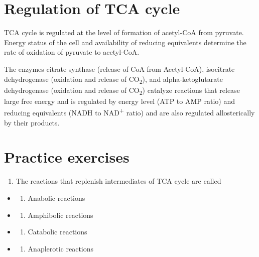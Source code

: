 \documentclass[
]{book}
\providecommand{\tightlist}{%
  \setlength{\itemsep}{0pt}\setlength{\parskip}{0pt}}
\begin{document}
\section{Regulation of TCA cycle}\label{regulation-of-tca-cycle}

TCA cycle is regulated at the level of formation of acetyl-CoA from pyruvate. Energy status of the cell and availability of reducing equivalents determine the rate of oxidation of pyruvate to acetyl-CoA.

The enzymes citrate synthase (release of CoA from Acetyl-CoA), isocitrate dehydrogenase (oxidation and release of CO\textsubscript{2}), and alpha-ketoglutarate dehydrogenase (oxidation and release of CO\textsubscript{2}) catalyze reactions that release large free energy and is regulated by energy level (ATP to AMP ratio) and reducing equivalents (NADH to NAD\textsuperscript{+} ratio) and are also regulated allosterically by their products.

\section{Practice exercises}\label{practice-exercises-2}

\begin{enumerate}
\def\labelenumi{\arabic{enumi}.}
\tightlist
\item
  The reactions that replenish intermediates of TCA cycle are called
\end{enumerate}

\begin{itemize}
\tightlist
\item
  \begin{enumerate}
  \def\labelenumi{(\Alph{enumi})}
  \tightlist
  \item
    Anabolic reactions\\
  \end{enumerate}
\item
  \begin{enumerate}
  \def\labelenumi{(\Alph{enumi})}
  \setcounter{enumi}{1}
  \tightlist
  \item
    Amphibolic reactions\\
  \end{enumerate}
\item
  \begin{enumerate}
  \def\labelenumi{(\Alph{enumi})}
  \setcounter{enumi}{2}
  \tightlist
  \item
    Catabolic reactions\\
  \end{enumerate}
\item
  \begin{enumerate}
  \def\labelenumi{(\Alph{enumi})}
  \setcounter{enumi}{3}
  \tightlist
  \item
    Anaplerotic reactions
  \end{enumerate}
\end{itemize}
\end{document}
